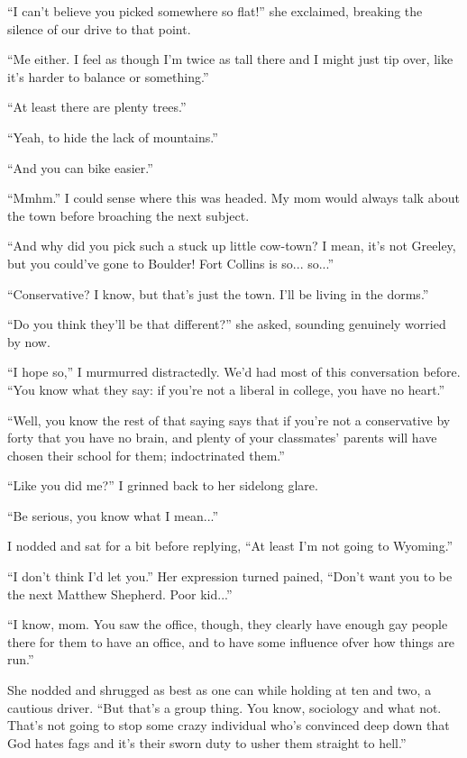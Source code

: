 ``I can't believe you picked somewhere so flat!'' she exclaimed, breaking the silence of our drive to that point.

``Me either.  I feel as though I'm twice as tall there and I might just tip over, like it's harder to balance or something.''

``At least there are plenty trees.''

``Yeah, to hide the lack of mountains.''

``And you can bike easier.''

``Mmhm.''  I could sense where this was headed.  My mom would always talk about the town before broaching the next subject.

``And why did you pick such a stuck up little cow-town?  I mean, it's not Greeley, but you could've gone to Boulder!  Fort Collins is so... so...''

``Conservative?  I know, but that's just the town.  I'll be living in the dorms.''

``Do you think they'll be that different?'' she asked, sounding genuinely worried by now.

``I hope so,'' I murmurred distractedly.  We'd had most of this conversation before.  ``You know what they say: if you're not a liberal in college, you have no heart.''

``Well, you know the rest of that saying says that if you're not a conservative by forty that you have no brain, and plenty of your classmates' parents will have chosen their school for them; indoctrinated them.''

``Like you did me?''  I grinned back to her sidelong glare.

``Be serious, you know what I mean...''

I nodded and sat for a bit before replying, ``At least I'm not going to Wyoming.''

``I don't think I'd let you.''  Her expression turned pained, ``Don't want you to be the next Matthew Shepherd.  Poor kid...''

``I know, mom.  You saw the office, though, they clearly have enough gay people there for them to have an office, and to have some influence ofver how things are run.''

She nodded and shrugged as best as one can while holding at ten and two, a cautious driver.  ``But that's a group thing.  You know, sociology and what not.  That's not going to stop some crazy individual who's convinced deep down that God hates fags and it's their sworn duty to usher them straight to hell.''

